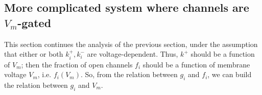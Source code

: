 


\subsection{More complicated system where channels are $V_m$-gated}
\label{sec:example_Vm-gating-channel}



This section continues the analysis of the previous section, under the
assumption that either or both $k^+_i, k^-_i$ are
voltage-dependent. Thus, $k^+$ should be a function of $V_m$; then the
fraction of open channels $f_i$ should be a function of membrane
voltage $V_m$, i.e. $f_i(V_m)$. So, from the relation between $g_i$
and $f_i$, we can build the relation between $g_i$ and $V_m$.


